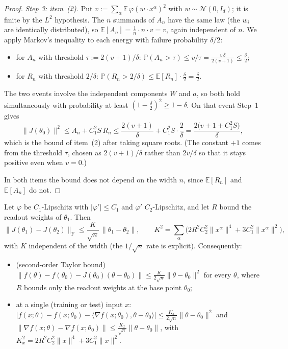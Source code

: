 \begin{proof}
\emph{Step 3: item~(2).} Put $v:=\sum_\alpha\mathbb E\,\varphi(w\cdot x^\alpha)^2$ with $w\sim\mathcal N(0,I_d)$; it is finite by the $L^2$ hypothesis. The $n$ summands of $A_n$ have the same law (the $w_i$ are identically distributed), so $\mathbb E[A_n]=\frac1n\cdot n\cdot v=v$, again independent of $n$. We apply Markov's inequality to each energy with failure probability $\delta/2$:
\begin{itemize}
  \item for $A_n$ with threshold $\tau:=2(v+1)/\delta$: $\mathbb P(A_n>\tau)\le v/\tau=\frac{v\,\delta}{2(v+1)}\le\frac\delta2$;
  \item for $R_n$ with threshold $2/\delta$: $\mathbb P(R_n>2/\delta)\le\mathbb E[R_n]\cdot\frac\delta2=\frac\delta2$.
\end{itemize}
The two events involve the independent components $W$ and $a$, so both hold simultaneously with probability at least $(1-\frac\delta2)^2\ge1-\delta$. On that event Step~1 gives
\[
  \|J(\theta_0)\|^2\le A_n+C_1^2S\,R_n\le\frac{2(v+1)}{\delta}+C_1^2S\cdot\frac2\delta=\frac{2\bigl(v+1+C_1^2S\bigr)}{\delta},
\]
which is the bound of item~(2) after taking square roots. (The constant $+1$ comes from the threshold $\tau$, chosen as $2(v+1)/\delta$ rather than $2v/\delta$ so that it stays positive even when $v=0$.)

In both items the bound does not depend on the width $n$, since $\mathbb E[R_n]$ and $\mathbb E[A_n]$ do not.
\end{proof}

\begin{theorem}\label{thm:ntktl:jacobianLipschitz}
  \leanok
Let $\varphi$ be $C_1$-Lipschitz with $|\varphi'|\le C_1$ and $\varphi'$ $C_2$-Lipschitz, and let $R$ bound the readout weights of $\theta_1$. Then
\[
  \|J(\theta_1)-J(\theta_2)\|_{\mathrm F}\le\frac{K}{\sqrt n}\,\|\theta_1-\theta_2\|,\qquad
  K^2=\sum_\alpha\bigl(2R^2C_2^2\|x^\alpha\|^4+3C_1^2\|x^\alpha\|^2\bigr),
\]
with $K$ independent of the width (the $1/\sqrt n$ rate is explicit). Consequently:
\begin{itemize}
  \item (second-order Taylor bound) $\|f(\theta)-f(\theta_0)-J(\theta_0)(\theta-\theta_0)\|\le\frac K{2\sqrt n}\|\theta-\theta_0\|^2$ for every $\theta$, where $R$ bounds only the readout weights at the base point $\theta_0$;
  \item at a single (training or test) input $x$: $|f(x;\theta)-f(x;\theta_0)-\langle\nabla f(x;\theta_0),\theta-\theta_0\rangle|\le\frac{K_x}{2\sqrt n}\|\theta-\theta_0\|^2$ and $\|\nabla f(x;\theta)-\nabla f(x;\theta_0)\|\le\frac{K_x}{\sqrt n}\|\theta-\theta_0\|$, with
        $K_x^2=2R^2C_2^2\|x\|^4+3C_1^2\|x\|^2$.
\end{itemize}
\end{theorem}

